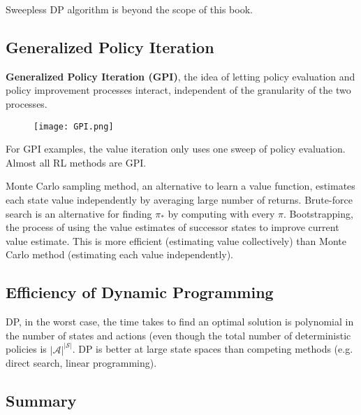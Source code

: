 \documentclass[sutton_barto_notes.tex]{subfiles}
\begin{document}
Sweepless DP algorithm is beyond the scope of this book.

\subsection{Generalized Policy Iteration}

\begin{definition}
\textbf{Generalized Policy Iteration (GPI)}, the idea of letting policy evaluation and policy improvement processes interact, independent of the granularity of the two processes.
\end{definition}
\begin{figure}[!h]
  \centering
  \texttt{[image: GPI.png]}
  \label{fig:GPI}
\end{figure}

For GPI examples, the value iteration only uses one sweep of policy evaluation. Almost all RL methods are GPI.

Monte Carlo sampling method, an alternative to learn a value function, estimates each state value independently by averaging large number of returns.
Brute-force search is an alternative for finding $\pi_*$ by computing with every $\pi$.
Bootstrapping, the process of using the value estimates of successor states to improve current value estimate. This is more efficient (estimating value collectively) than Monte Carlo method (estimating each value independently).

\subsection{Efficiency of Dynamic Programming}

DP, in the worst case, the time takes to find an optimal solution is polynomial in the number of states and actions (even though the total number of deterministic policies is $|\mathcal{A}|^{|\mathcal{S}|}$. DP is better at large state spaces than competing methods (e.g. direct search, linear programming).

\subsection{Summary}
\end{document}
